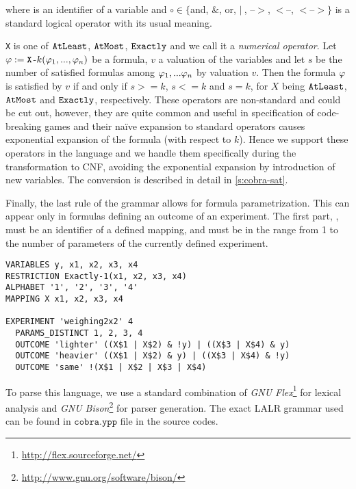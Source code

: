 where  is an identifier of a variable
and $\circ\in\{$and, $\&$, or, $|\:$, --$>$, $<$--, $<$--$>\}$
is a standard logical operator with its usual meaning.

\texttt{X} is one of $\mathtt{AtLeast}$, $\mathtt{AtMost}$, $\mathtt{Exactly}$
  and we call it a \emph{numerical operator}.
Let $\varphi := \mathtt{X}$-$k(\varphi_1, ..., \varphi_n)$ be a formula,
  $v$ a valuation of the variables and let $s$ be the number
  of satisfied formulas among $\varphi_1, ...\varphi_n$ by valuation $v$.
Then the formula $\varphi$ is satisfied by $v$ if and only
  if $s>=k$, $s<=k$ and $s=k$,
  for $X$ being $\mathtt{AtLeast}$, $\mathtt{AtMost}$ and $\mathtt{Exactly}$, respectively.
These operators are non-standard and could be cut out,
  however, they are quite common and useful in specification of code-breaking games
  and their na\"ive expansion to standard operators causes exponential
  expansion of the formula (with respect to $k$).
Hence we support these operators in the language and we handle
  them specifically during the transformation to CNF,
  avoiding the exponential expansion by introduction of new variables.
The conversion is described in detail in \autoref{s:cobra-sat}.

Finally, the last rule of the grammar allows for formula parametrization.
This can appear only in formulas defining an outcome of an experiment.
The first part, , must be an identifier of a defined mapping,
  and  must be in the range from 1 to the number of parameters
  of the currently defined experiment.

\begin{example}
\begin{lstlisting}
VARIABLES y, x1, x2, x3, x4
RESTRICTION Exactly-1(x1, x2, x3, x4)
ALPHABET '1', '2', '3', '4'
MAPPING X x1, x2, x3, x4

EXPERIMENT 'weighing2x2' 4
  PARAMS_DISTINCT 1, 2, 3, 4
  OUTCOME 'lighter' ((X$1 | X$2) & !y) | ((X$3 | X$4) & y)
  OUTCOME 'heavier' ((X$1 | X$2) & y) | ((X$3 | X$4) & !y)
  OUTCOME 'same' !(X$1 | X$2 | X$3 | X$4)
\end{lstlisting}
\end{example}

To parse this language, we use a standard combination of
\emph{GNU Flex}\footnote{\url{http://flex.sourceforge.net/}} for lexical analysis and
\emph{GNU Bison}\footnote{\url{http://www.gnu.org/software/bison/}} for parser generation.
The exact LALR grammar used can be found in $\texttt{cobra.ypp}$ file
  in the source codes.

